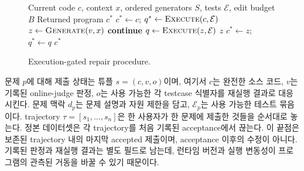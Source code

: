 \documentclass[10pt,conference]{IEEEtran}
\begin{document}
\begin{figure}[h]
\small
\begin{algorithmic}[1]
\Require Current code $c$, context $x$, ordered generators $S$, tests $\mathcal E$, edit budget $B$
\Ensure Returned program $c^*$
\State $c^*\gets c$; $q^*\gets\textsc{Execute}(c,\mathcal E)$
 \State $z\gets\textsc{Generate}(v,x)$
  \State \textbf{continue}
 \EndIf
 \State $q\gets\textsc{Execute}(z,\mathcal E)$
  \State \Return $z$ \EndIf
  \State $c^*\gets z$; $q^*\gets q$
 \EndIf
\EndFor
\State \Return $c^*$
\end{algorithmic}
\caption{Execution-gated repair procedure.}
\label{alg:generic}
\end{figure}
\label{sec:formulation}
문제 \(p\)에 대해 제출 상태는 튜플 \(s=(c,v,o)\)이며, 여기서 \(c\)는 완전한 소스 코드, \(v\)는 기록된 online-judge 판정, \(o\)는 사용 가능한 각 testcase 식별자를 재실행 결과로 대응시킨다. 문제 맥락 \(d_p\)는 문제 설명과 자원 제한을 담고, \(\mathcal E_p\)는 사용 가능한 테스트 묶음이다. trajectory \(\tau=[s_1,\ldots,s_n]\)은 한 사용자가 한 문제에 제출한 것들을 순서대로 놓는다. 정본 데이터셋은 각 trajectory를 처음 기록된 acceptance에서 끊는다. 이 끝점은 보존된 trajectory 내의 마지막 accepted 제출이며, acceptance 이후의 수정이 아니다. 기록된 판정과 재실행 결과는 별도 필드로 남는데, 런타임 버전과 실행 변동성이 프로그램의 관측된 거동을 바꿀 수 있기 때문이다.
\end{document}
